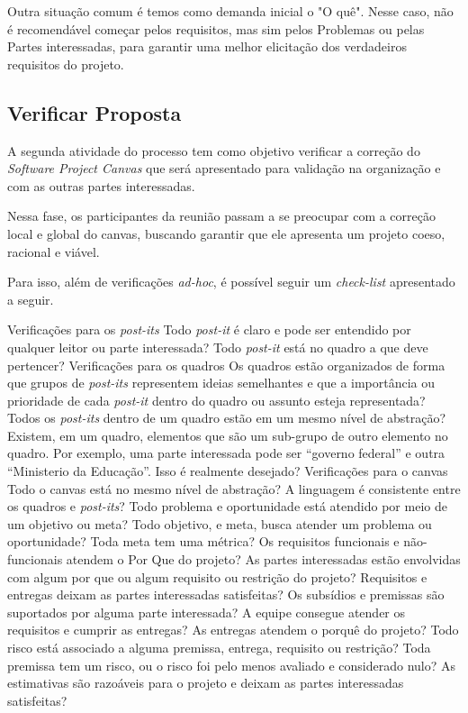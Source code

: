 \documentclass[fontsize=12pt, a4paper,pagesize=auto,toc=listof, ,twoside,chapterprefix=false,appendixprefix=true,open=right]{scrbook}
\begin{document}
Outra situação comum é temos como demanda inicial o "O quê". Nesse caso, não é recomendável começar pelos requisitos, mas sim pelos Problemas ou pelas Partes interessadas, para garantir uma melhor elicitação dos verdadeiros requisitos do projeto.

\subsection{Verificar Proposta}

A segunda atividade do processo tem como objetivo verificar a correção do \textit{Software Project Canvas} que será apresentado para validação na organização e com as outras partes interessadas.

Nessa fase, os participantes da reunião passam a se preocupar com a correção local e global do canvas, buscando garantir que ele apresenta um projeto coeso, racional e viável.

Para isso, além de verificações \textit{ad-hoc}, é possível seguir um \textit{check-list} apresentado a seguir.
\begin{outline}
    \1 Verificações para os \textit{post-its}
    \2 Todo \textit{post-it} é claro e pode ser entendido por qualquer leitor ou parte interessada?
    \2 Todo \textit{post-it} está no quadro a que deve pertencer?
    \1 Verificações para os quadros
    \2 Os quadros estão organizados de forma que grupos de \textit{post-its} representem ideias semelhantes e que a importância ou prioridade de cada \textit{post-it} dentro do quadro ou assunto esteja representada?
    \2 Todos os \textit{post-its} dentro de um quadro estão em um mesmo nível de abstração?
    \2 Existem, em um quadro, elementos que são um sub-grupo de outro elemento no quadro. Por exemplo, uma parte interessada pode ser ``governo federal'' e outra ``Ministerio da Educação''. Isso é realmente desejado?
    \1 Verificações para o canvas
    \2 Todo o canvas está no mesmo nível de abstração?
    \2 A linguagem é consistente entre os quadros e \textit{post-its}?
    \2 Todo problema e oportunidade está atendido por meio de um objetivo ou meta?
    \2 Todo objetivo, e meta, busca atender um problema ou oportunidade?
    \2 Toda meta tem uma métrica?
    \2 Os requisitos funcionais e não-funcionais atendem o Por Que do projeto?
    \2 As partes interessadas estão envolvidas com algum por que ou algum requisito ou restrição do projeto?
    \2 Requisitos e entregas deixam as partes interessadas satisfeitas?
    \2 Os subsídios e premissas são suportados por alguma parte interessada?
    \2 A equipe consegue atender os requisitos e cumprir as entregas?
    \2 As entregas atendem o porquê do projeto?
    \2 Todo risco está associado a alguma premissa, entrega, requisito ou restrição?
    \2 Toda premissa tem um risco, ou o risco foi pelo menos avaliado e considerado nulo?
    \2 As estimativas são razoáveis para o projeto e deixam as partes interessadas satisfeitas?
\end{outline}
\end{document}
